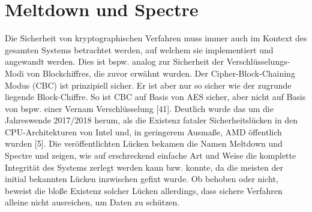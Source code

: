 \documentclass[conference,10pt,a4paper,twocolumn]{IEEEtran}
\begin{document}
%




\section{Meltdown und Spectre}
Die Sicherheit von kryptographischen Verfahren muss immer auch im Kontext des gesamten Systems betrachtet werden, auf welchem sie implementiert und angewandt werden. Dies ist bspw. analog zur Sicherheit der Verschlüsselungs-Modi von Blockchiffres, die zuvor erwähnt wurden. Der Cipher-Block-Chaining Modus (CBC) ist prinzipiell sicher. Er ist aber nur so sicher wie der zugrunde liegende Block-Chiffre. So ist CBC auf Basis von AES sicher, aber nicht auf Basis von bspw. einer Vernam Verschlüsselung [41]. \linebreak
Deutlich wurde das um die Jahreswende 2017/2018 herum, als die Existenz fataler Sicherheitslücken in den CPU-Architekturen von Intel und, in geringerem Ausmaße, AMD öffentlich wurden [5]. Die veröffentlichten Lücken bekamen die Namen Meltdown und Spectre und zeigen, wie auf erschreckend einfache Art und Weise die komplette Integrität des Systems zerlegt werden kann bzw. konnte, da die meisten der initial bekannten Lücken inzwischen gefixt wurde. Ob behoben oder nicht, beweist die bloße Existenz solcher Lücken allerdings, dass sichere Verfahren alleine nicht ausreichen, um Daten zu schützen.
\end{document}
